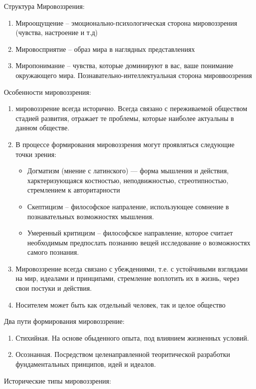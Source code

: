 \documentclass[12pt,a4paper]{book}
\begin{document}
Структура Мировоззрения:
\begin{enumerate}
	\item Мироощущение -- эмоционально-психологическая сторона мировоззрения (чувства, настроение и т.д)
	\item Мировосприятие -- образ мира в наглядных представлениях
	\item Миропонимание -- чувства, которые доминируют в вас, ваше понимание окружающего мира. Познавательно-интеллектуальная сторона мироввоозрения
\end{enumerate}
Особенности мировоззрения:
\begin{enumerate}
	\item мировоззрение всегда исторично. Всегда связано с переживаемой обществом стадией развития, отражает те проблемы, которые наиболее актуальны в данном обществе.
	\item В процессе формирования мировоззрения могут проявляться следующие точки зрения:
	\begin{itemize}
		\item Догматизм (мнение с латинского) --- форма мышления и действия, харктеризующаяся костностью, неподвижностью, стреотипностью, стремлением к авторитарности 
		\item Скептицизм -- философское напраление, использующее сомнение в познавательных возможностях мышления.
		\item Умеренный критицизм -- философское направление, которое считает необходимым предпослать познанию вещей исследование о возможностях самого познания.
	\end{itemize}
	\item Мировоззрение всегда связано с убеждениями, т.е. с устойчивыми взглядами на мир, идеалами и принципами, стремление воплотить их в жизнь, через свои постуки и действия.
	\item Носителем может быть как отдельный человек, так и целое общество
\end{enumerate}
Два пути формирования мировоззрение:
\begin{enumerate}
	\item Стихийная. На основе обыденного опыта, под влиянием жизненных условий.
	\item Осознанная. Посредством целенаправленной теоритической разработки фундаментальных принципов, идей и идеалов.
\end{enumerate}
Исторические типы мировоззрения:
\end{document}
